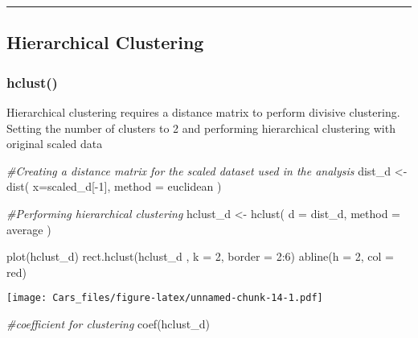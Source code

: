 \documentclass[
]{article}
\newenvironment{Shaded}{\begin{snugshade}}{\end{snugshade}}
\newcommand{\AttributeTok}[1]{\textcolor[rgb]{0.77,0.63,0.00}{#1}}
\newcommand{\CommentTok}[1]{\textcolor[rgb]{0.56,0.35,0.01}{\textit{#1}}}
\newcommand{\DecValTok}[1]{\textcolor[rgb]{0.00,0.00,0.81}{#1}}
\newcommand{\FunctionTok}[1]{\textcolor[rgb]{0.00,0.00,0.00}{#1}}
\newcommand{\NormalTok}[1]{#1}
\newcommand{\OtherTok}[1]{\textcolor[rgb]{0.56,0.35,0.01}{#1}}
\newcommand{\SpecialCharTok}[1]{\textcolor[rgb]{0.00,0.00,0.00}{#1}}
\newcommand{\StringTok}[1]{\textcolor[rgb]{0.31,0.60,0.02}{#1}}
\begin{document}
\begin{center}\rule{0.5\linewidth}{0.5pt}\end{center}

\hypertarget{hierarchical-clustering}{%
\subsection{Hierarchical Clustering}\label{hierarchical-clustering}}

\hypertarget{hclust}{%
\subsubsection{hclust()}\label{hclust}}

Hierarchical clustering requires a distance matrix to perform divisive
clustering. Setting the number of clusters to 2 and performing
hierarchical clustering with original scaled data

\begin{Shaded}
\begin{Highlighting}[]
\CommentTok{\#Creating a distance matrix for the scaled dataset used in the analysis}
\NormalTok{dist\_d }\OtherTok{\textless{}{-}} \FunctionTok{dist}\NormalTok{(}
  \AttributeTok{x=}\NormalTok{scaled\_d[}\SpecialCharTok{{-}}\DecValTok{1}\NormalTok{],}
  \AttributeTok{method =} \StringTok{\textquotesingle{}euclidean\textquotesingle{}}
\NormalTok{)}

\CommentTok{\#Performing hierarchical clustering}
\NormalTok{hclust\_d }\OtherTok{\textless{}{-}} \FunctionTok{hclust}\NormalTok{(}
  \AttributeTok{d =}\NormalTok{ dist\_d,}
  \AttributeTok{method =} \StringTok{\textquotesingle{}average\textquotesingle{}}
\NormalTok{)}

\FunctionTok{plot}\NormalTok{(hclust\_d)}
\FunctionTok{rect.hclust}\NormalTok{(hclust\_d , }\AttributeTok{k =} \DecValTok{2}\NormalTok{, }\AttributeTok{border =} \DecValTok{2}\SpecialCharTok{:}\DecValTok{6}\NormalTok{)}
\FunctionTok{abline}\NormalTok{(}\AttributeTok{h =} \DecValTok{2}\NormalTok{, }\AttributeTok{col =} \StringTok{\textquotesingle{}red\textquotesingle{}}\NormalTok{)}
\end{Highlighting}
\end{Shaded}

\texttt{[image: Cars\_files/figure-latex/unnamed-chunk-14-1.pdf]}

\begin{Shaded}
\begin{Highlighting}[]
\CommentTok{\#coefficient for clustering}
\FunctionTok{coef}\NormalTok{(hclust\_d)}
\end{Highlighting}
\end{Shaded}
\end{document}
